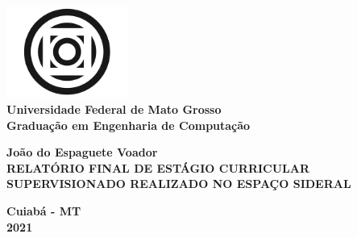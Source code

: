 \documentclass[12pt]{article}
\newcommand{\autorrel}{João do Espaguete Voador}
\newcommand{\titulorel}{RELATÓRIO FINAL DE ESTÁGIO CURRICULAR SUPERVISIONADO REALIZADO NO ESPAÇO SIDERAL}
\newcommand{\cidaderel}{Cuiabá - MT}
\newcommand{\anorel}{2021}
\begin{document}
    \begin{titlepage}
        \centering
        \includegraphics[width=4cm]{assets/logo-ufmt.png}\\
        {   
            \fontsize{14pt}{14}\selectfont 
            \textbf{Universidade Federal de Mato Grosso} \\
            \textbf{Graduação em Engenharia de Computação} \\
        }
        
        \vfill
        {\textbf{\autorrel}\\}
        {
            \fontsize{14pt}{20}\selectfont
            \textbf{\titulorel}\\
        }
        \vfill

        {\textbf{\cidaderel}\\}
        {\textbf{\anorel}}
    \end{titlepage}
\end{document}
